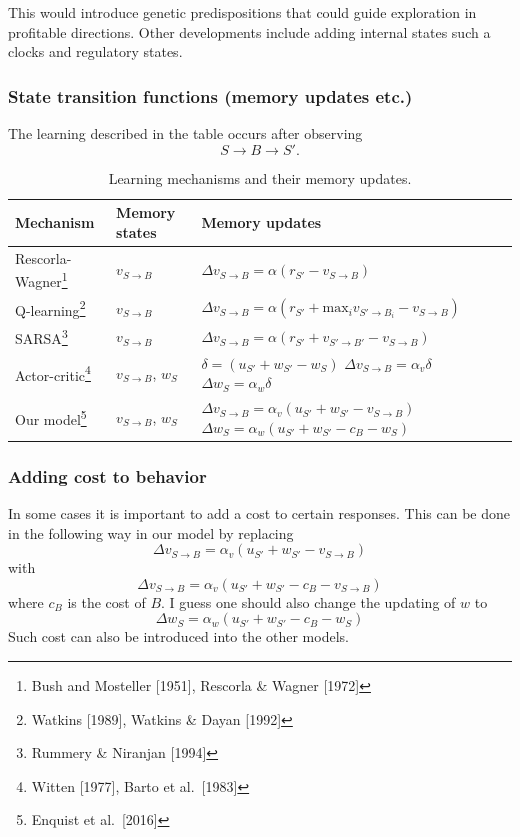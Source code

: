 \documentclass[11pt]{article}
\begin{document}
This would introduce genetic predispositions that could guide exploration
in profitable directions. Other developments include adding internal states
such a clocks and regulatory states.

\subsubsection{State transition functions (memory updates etc.)}
The learning described in the table occurs after observing
\[
S\rightarrow B\rightarrow S'.
\]
\begin{table}[h]
	\def\arraystretch{1.2} %
	\begin{tabular}[t]{|L{2.2cm}|L{2cm}|L{7cm}|}
		\hline
		Mechanism             & Memory states   & Memory updates \\
		\hline
		Rescorla-Wagner\footnote{Bush and Mosteller [1951], Rescorla \& Wagner [1972]}
		& $v_{S\to B}$        & $\Delta v_{S\to B}=\alpha(r_{S'}-v_{S\to B})$ \\ \hline
		Q-learning\footnote{Watkins [1989], Watkins \& Dayan [1992]}
		& $v_{S\to B}$        & $\Delta v_{S\to B}=\alpha(r_{S'}+\textrm{max}_{i}v_{S'\to B_{i}}-v_{S\to B})$ \\ \hline
		SARSA\footnote{Rummery \& Niranjan [1994]}
		& $v_{S\to B}$        & $\Delta v_{S\to B}=\alpha(r_{S'}+v_{S'\to B'}-v_{S\to B})$ \\ \hline
		Actor-critic\footnote{Witten [1977], Barto et al.\ [1983]}
		& $v_{S\to B}$, $w_S$ & \parbox{7cm}{$\delta=(u_{S'}+w_{S'}-w_{S})$ \\$\Delta v_{S\to B}=\alpha_{v}\delta$ \\$\Delta w_{S}=\alpha_{w}\delta$} \\ \hline
		Our model\footnote{Enquist et al.\ [2016]}
		& $v_{S\to B}$, $w_S$ & \parbox{7 cm}{$\Delta v_{S\to B}=\alpha_{v}(u_{S'}+w_{S'}-v_{S\to B})$ \\$\Delta w_{S}=\alpha_{w}(u_{S'}+w_{S'}-c_{B}-w_{S})$} \\ \hline
	\end{tabular}
	\caption{Learning mechanisms and their memory updates. \label{tab:mechanisms}}
\end{table}

\subsubsection{Adding cost to behavior}
In some cases it is important to add a cost to certain responses.
This can be done in the following way in our model by replacing
\[
\Delta v_{S\to B}=\alpha_{v}(u_{S'}+w_{S'}-v_{S\to B})
\]
with 
\[
\Delta v_{S\to B}=\alpha_{v}(u_{S'}+w_{S'}-c_{B}-v_{S\to B})
\]
where $c_{B}$ is the cost of $B$. I guess one should also change the updating of $w$ to
\[
\Delta w_{S}=\alpha_{w}(u_{S'}+w_{S'}-c_{B}-w_{S})
\]
Such cost can also be introduced into the other models.
\end{document}
